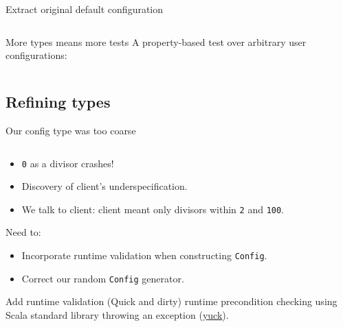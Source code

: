 \begin{frame}[fragile]{Extract original default configuration}
  \inputminted{scala}{Defaults1.scala}
\end{frame}

\begin{frame}[fragile]{More types means more tests}
  A property-based test over \alert{arbitrary} user configurations:
  \inputminted[gobble=2]{scala}{FizzBuzzSpec6.scala}
\end{frame}

\subsection{Refining types}

\begin{frame}[fragile]{Our config type was too coarse}
  \inputminted{console}{testQuick6.console}

  \begin{itemize}
  \item \texttt{0} as a divisor \alert{crashes}!
  \item Discovery of client's \alert{underspecification}.
  \item We talk to client: client meant only divisors within \texttt{2} and \texttt{100}.
  \end{itemize}

  Need to:
  \begin{itemize}
  \item Incorporate runtime \alert{validation} when constructing \texttt{Config}.
  \item Correct our random \texttt{Config} generator.
  \end{itemize}
\end{frame}

\begin{frame}[fragile]{Add runtime validation}
  (Quick and dirty) \alert{runtime} precondition checking using Scala standard library throwing an \alert{exception} (\href{http://blog.jessitron.com/2013/06/whats-dirtier-than-comments-exceptions.html}{yuck}).

  \inputminted[gobble=2]{scala}{FizzBuzz3Validate.scala}
\end{frame}

